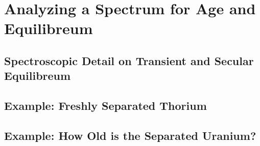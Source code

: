 \chapter{Analyzing a Spectrum for Age and Equilibreum}

\section{Spectroscopic Detail on Transient and Secular Equilibreum}

\section{Example: Freshly Separated Thorium}

\section{Example: How Old is the Separated Uranium?}

